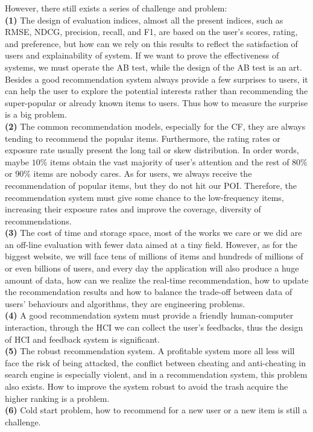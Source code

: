 \documentclass[10pt,twocolumn,letterpaper]{article}
\begin{document}
However, there still exists a series of challenge and problem:\\ 
{\bf (1)} The design of evaluation indices, almost all the present indices, such as RMSE, NDCG, precision, recall, and F1, are based on the user's scores, rating, and preference, but how can we rely on this results to reflect the satisfaction of users and explainability of system. If we want to prove the effectiveness of systems, we must operate the AB test, while the design of the AB test is an art. Besides a good recommendation system always provide a few surprises to users, it can help the user to explore the potential interests rather than recommending the super-popular or already known items to users. Thus how to measure the surprise is a big problem.\\ 
{\bf (2)} The common recommendation models, especially for the CF, they are always tending to recommend the popular items. Furthermore, the rating rates or exposure rate usually present the long tail or skew distribution. In order words, maybe $10\%$ items obtain the vast majority of user's attention and the rest of $80\%$ or $90\%$ items are nobody cares. As for users, we always receive the recommendation of popular items, but they do not hit our POI. Therefore, the recommendation system must give some chance to the low-frequency items, increasing their exposure rates and improve the coverage, diversity of recommendations.\\ 
{\bf (3)} The cost of time and storage space, most of the works we care or we did are an off-line evaluation with fewer data aimed at a tiny field. However, as for the biggest website, we will face tens of millions of items and hundreds of millions of or even billions of users, and every day the application will also produce a huge amount of data, how can we realize the real-time recommendation, how to update the recommendation results and how to balance the trade-off between data of users' behaviours and algorithms, they are engineering problems.\\
{\bf (4)} A good recommendation system must provide a friendly human-computer interaction, through the HCI we can collect the user's feedbacks, thus the design of HCI and feedback system is significant.\\ 
{\bf (5)} The robust recommendation system. A profitable system more all less will face the risk of being attacked, the conflict between cheating and anti-cheating in search engine is especially violent, and in a recommendation system, this problem also exists. How to improve the system robust to avoid the trash acquire the higher ranking is a problem.\\
{\bf (6)} Cold start problem, how to recommend for a new user or a new item is still a challenge. 
\end{document}
